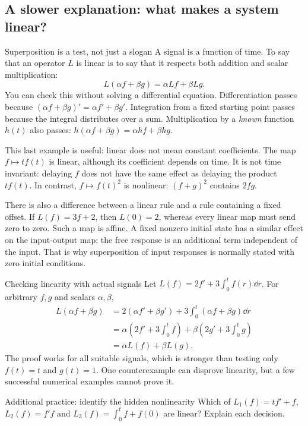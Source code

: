 \subsection{A slower explanation: what makes a system linear?}
\begin{concept}{Superposition is a test, not just a slogan}
A signal is a function of time. To say that an operator $L$ is linear is to say that it respects both addition and scalar multiplication:
\[L(\alpha f+\beta g)=\alpha Lf+\beta Lg.\]
You can check this without solving a differential equation. Differentiation passes because $(\alpha f+\beta g)'=\alpha f'+\beta g'$. Integration from a fixed starting point passes because the integral distributes over a sum. Multiplication by a \emph{known} function $h(t)$ also passes: $h(\alpha f+\beta g)=\alpha hf+\beta hg$.

This last example is useful: linear does not mean constant coefficients. The map $f\mapsto tf(t)$ is linear, although its coefficient depends on time. It is not time invariant: delaying $f$ does not have the same effect as delaying the product $tf(t)$. In contrast, $f\mapsto f(t)^2$ is nonlinear: $(f+g)^2$ contains $2fg$.

There is also a difference between a linear rule and a rule containing a fixed offset. If $L(f)=3f+2$, then $L(0)=2$, whereas every linear map must send zero to zero. Such a map is affine. A fixed nonzero initial state has a similar effect on the input-output map: the free response is an additional term independent of the input. That is why superposition of input responses is normally stated with zero initial conditions.
\end{concept}
\begin{worked}{Checking linearity with actual signals}
Let $L(f)=2f'+3\int_0^t f(r)\dd r$. For arbitrary $f,g$ and scalars $\alpha,\beta$,
\begin{align*}
L(\alpha f+\beta g)&=2(\alpha f'+\beta g')+3\int_0^t(\alpha f+\beta g)\dd r\\
&=\alpha\left(2f'+3\int_0^t f\right)+\beta\left(2g'+3\int_0^t g\right)\\
&=\alpha L(f)+\beta L(g).
\end{align*}
The proof works for all suitable signals, which is stronger than testing only $f(t)=t$ and $g(t)=1$. One counterexample can disprove linearity, but a few successful numerical examples cannot prove it.
\end{worked}
\begin{question}{Additional practice: identify the hidden nonlinearity}
Which of $L_1(f)=tf'+f$, $L_2(f)=f'f$ and $L_3(f)=\int_0^t f+f(0)$ are linear? Explain each decision.
\end{question}
